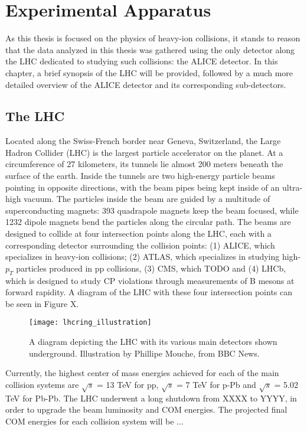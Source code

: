 \chapter{Experimental Apparatus}
As this thesis is focused on the physics of heavy-ion collisions, it stands to reason that the data analyzed in this thesis was gathered using the only detector along the LHC dedicated to studying such collisions: the ALICE detector.
In this chapter, a brief synopsis of the LHC will be provided, followed by a much more detailed overview of the ALICE detector and its corresponding sub-detectors. 

\section{The LHC}
Located along the Swiss-French border near Geneva, Switzerland, the Large Hadron Collider (LHC) is the largest particle accelerator on the planet.
At a circumference of 27 kilometers, its tunnels lie almost 200 meters beneath the surface of the earth.
Inside the tunnels are two high-energy particle beams pointing in opposite directions, with the beam pipes being kept inside of an ultra-high vacuum.
The particles inside the beam are guided by a multitude of superconducting magnets: 393 quadrapole magnets keep the beam focused, while 1232 dipole magnets bend the particles along the circular path. 
The beams are designed to collide at four intersection points along the LHC, each with a corresponding detector surrounding the collision points: (1) ALICE, which specializes in heavy-ion collisions; (2) ATLAS, which specializes in studying high-$p_{T}$ particles produced in pp collisions, (3) CMS, which TODO and (4) LHCb, which is designed to study CP violations through measurements of B mesons at forward rapidity. 
A diagram of the LHC with these four intersection points can be seen in Figure X.
\begin{figure}
    \centering
    \texttt{[image: lhcring\_illustration]}
    \caption{A diagram depicting the LHC with its various main detectors shown underground. Illustration by Phillipe Mouche, from BBC News.}
    \label{fig:my_label}
\end{figure}

Currently, the highest center of mass energies achieved for each of the main collision systems are $\sqrt{s}$ = 13 TeV for pp, $\sqrt{s}$ = 7 TeV for p-Pb and $\sqrt{s}$ = 5.02 TeV for Pb-Pb. 
The LHC underwent a long shutdown from XXXX to YYYY, in order to upgrade the beam luminosity and COM energies. 
The projected final COM energies for each collision system will be ... 
